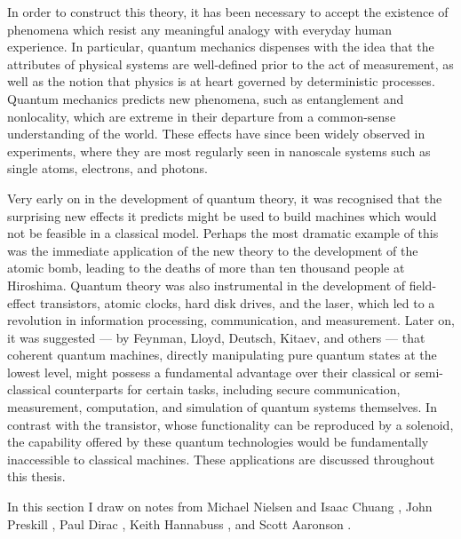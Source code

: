 In order to construct this theory, it has been necessary to accept the existence of phenomena which resist any meaningful analogy with everyday human experience. In particular, quantum mechanics dispenses with the idea that the attributes of physical systems are well-defined prior to the act of measurement, as well as the notion that physics is at heart governed by deterministic processes. Quantum mechanics predicts new phenomena, such as entanglement and nonlocality, which are extreme in their departure from a common-sense understanding of the world.  These effects have since been widely observed in experiments, where they are most regularly seen in nanoscale systems such as single atoms, electrons, and photons.

Very early on in the development of quantum theory, it was recognised that the surprising new effects it predicts might be used to build machines which would not be feasible in a classical model. Perhaps the most dramatic example of this was the immediate application of the new theory to the development of the atomic bomb, leading to the deaths of more than ten thousand people at Hiroshima. Quantum theory was also instrumental in the development of field-effect transistors, atomic clocks, hard disk drives, and the laser, which led to a revolution in information processing, communication, and measurement.
Later on, it was suggested --- by Feynman, Lloyd, Deutsch, Kitaev, and others --- that coherent quantum machines, directly manipulating pure quantum states at the lowest level, might possess a fundamental advantage over their classical or semi-classical counterparts for certain tasks, including secure communication, measurement, computation, and simulation of quantum systems themselves. In contrast with the transistor, whose functionality can be reproduced by a solenoid, the capability offered by these quantum technologies would be fundamentally inaccessible to classical machines.  
These applications are discussed throughout this thesis.

In this section I draw on notes from Michael Nielsen and Isaac Chuang \cite{Nielsen2004}, John Preskill \cite{Preskill}, Paul Dirac \cite{Dirac1982}, Keith Hannabuss \cite{HannabussBook}, and Scott Aaronson \cite{AaronsonBook}.

